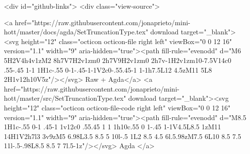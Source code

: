   <div id="github-links">
    <div class="view-source">
      
        <a href="https://raw.githubusercontent.com/jonaprieto/mini-hott/master/docs/agda/SetTruncationType.tex" download target="_blank"><svg height="12" class="octicon octicon-file right left" viewBox="0 0 12 16" version="1.1" width="9" aria-hidden="true"><path fill-rule="evenodd" d="M6 5H2V4h4v1zM2 8h7V7H2v1zm0 2h7V9H2v1zm0 2h7v-1H2v1zm10-7.5V14c0 .55-.45 1-1 1H1c-.55 0-1-.45-1-1V2c0-.55.45-1 1-1h7.5L12 4.5zM11 5L8 2H1v12h10V5z"/></svg> Raw + Agda</a>
        <a href="https://raw.githubusercontent.com/jonaprieto/mini-hott/master/src/SetTruncationType.tex" download target="_blank"><svg height="12" class="octicon octicon-file-code right left" viewBox="0 0 12 16" version="1.1" width="9" aria-hidden="true"><path fill-rule="evenodd" d="M8.5 1H1c-.55 0-1 .45-1 1v12c0 .55.45 1 1 1h10c.55 0 1-.45 1-1V4.5L8.5 1zM11 14H1V2h7l3 3v9zM5 6.98L3.5 8.5 5 10l-.5 1L2 8.5 4.5 6l.5.98zM7.5 6L10 8.5 7.5 11l-.5-.98L8.5 8.5 7 7l.5-1z"/></svg> Agda </a>
      
